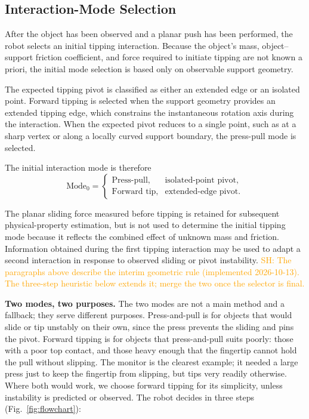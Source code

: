 \documentclass[10pt, conference]{IEEEtran}
\newcommand{\sh}[1]{\textcolor{orange}{SH: #1}}
\begin{document}
\subsection{Interaction-Mode Selection}
\label{sec:mode_selection}

After the object has been observed and a planar push has been performed, the robot selects an initial tipping interaction. Because the object's mass, object--support friction coefficient, and force required to initiate tipping are not known a priori, the initial mode selection is based only on observable support geometry.

The expected tipping pivot is classified as either an extended edge or an isolated point. Forward tipping is selected when the support geometry provides an extended tipping edge, which constrains the instantaneous rotation axis during the interaction. When the expected pivot reduces to a single point, such as at a sharp vertex or along a locally curved support boundary, the press-pull mode is selected.

The initial interaction mode is therefore
\begin{equation}
    \boxed{
    \text{Mode}_0 =
    \begin{cases}
        \text{Press-pull}, & \text{isolated-point pivot}, \\[4pt]
        \text{Forward tip}, & \text{extended-edge pivot}.
    \end{cases}
    }
    \label{eq:mode_selection}
\end{equation}

The planar sliding force measured before tipping is retained for subsequent physical-property estimation, but is not used to determine the initial tipping mode because it reflects the combined effect of unknown mass and friction. Information obtained during the first tipping interaction may be used to adapt a second interaction in response to observed sliding or pivot instability. \sh{The paragraphs above describe the interim geometric rule (implemented 2026-10-13). The three-step heuristic below extends it; merge the two once the selector is final.}

\noindent \textbf{Two modes, two purposes.} The two modes are not a main method and a fallback; they serve different purposes. Press-and-pull is for objects that would slide or tip unstably on their own, since the press prevents the sliding and pins the pivot. Forward tipping is for objects that press-and-pull suits poorly: those with a poor top contact, and those heavy enough that the fingertip cannot hold the pull without slipping. The monitor is the clearest example; it needed a large press just to keep the fingertip from slipping, but tips very readily otherwise. Where both would work, we choose forward tipping for its simplicity, unless instability is predicted or observed. The robot decides in three steps (Fig.~\ref{fig:flowchart}):
\end{document}
